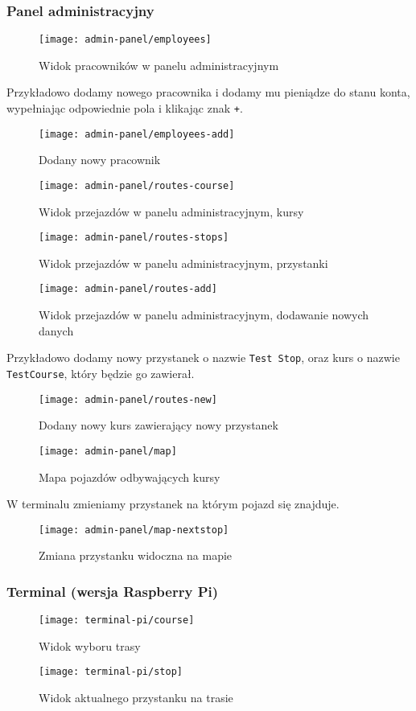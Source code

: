 \subsubsection{Panel administracyjny}
\begin{figure}[H]
  \centering
  \texttt{[image: admin-panel/employees]}
  \caption{Widok pracowników w panelu administracyjnym}
\end{figure}
Przykładowo dodamy nowego pracownika i dodamy mu pieniądze do stanu konta, wypełniając odpowiednie pola i klikając znak \verb|+|.
\begin{figure}[H]
  \centering
  \texttt{[image: admin-panel/employees-add]}
  \caption{Dodany nowy pracownik}
\end{figure}
\begin{figure}[H]
  \centering
  \texttt{[image: admin-panel/routes-course]}
  \caption{Widok przejazdów w panelu administracyjnym, kursy}
\end{figure}
\begin{figure}[H]
  \centering
  \texttt{[image: admin-panel/routes-stops]}
  \caption{Widok przejazdów w panelu administracyjnym, przystanki}
\end{figure}
\begin{figure}[H]
  \centering
  \texttt{[image: admin-panel/routes-add]}
  \caption{Widok przejazdów w panelu administracyjnym, dodawanie nowych danych}
\end{figure}
Przykładowo dodamy nowy przystanek o nazwie \verb|Test Stop|, oraz kurs o nazwie \verb|TestCourse|, który będzie go zawierał.
\begin{figure}[H]
  \centering
  \texttt{[image: admin-panel/routes-new]}
  \caption{Dodany nowy kurs zawierający nowy przystanek}
\end{figure}
\begin{figure}[H]
  \centering
  \texttt{[image: admin-panel/map]}
  \caption{Mapa pojazdów odbywających kursy}
\end{figure}
W terminalu zmieniamy przystanek na którym pojazd się znajduje.
\begin{figure}[H]
  \centering
  \texttt{[image: admin-panel/map-nextstop]}
  \caption{Zmiana przystanku widoczna na mapie}
\end{figure}
\subsubsection{Terminal (wersja Raspberry Pi)}
\begin{figure}[H]
  \centering
  \texttt{[image: terminal-pi/course]}
  \caption{Widok wyboru trasy}
\end{figure}
\begin{figure}[H]
  \centering
  \texttt{[image: terminal-pi/stop]}
  \caption{Widok aktualnego przystanku na trasie}
\end{figure}
